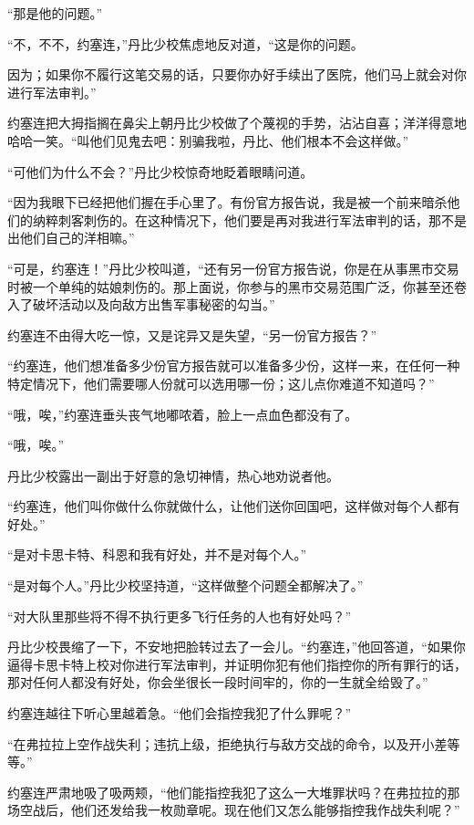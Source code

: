     “那是他的问题。”

    “不，不不，约塞连，”丹比少校焦虑地反对道，“这是你的问题。

    因为；如果你不履行这笔交易的话，只要你办好手续出了医院，他们马上就会对你进行军法审判。”

    约塞连把大拇指搁在鼻尖上朝丹比少校做了个蔑视的手势，沾沾自喜；洋洋得意地哈哈一笑。“叫他们见鬼去吧：别骗我啦，丹比、他们根本不会这样做。”

    “可他们为什么不会？”丹比少校惊奇地眨着眼睛问道。

    “因为我眼下已经把他们握在手心里了。有份官方报告说，我是被一个前来暗杀他们的纳粹刺客刺伤的。在这种情况下，他们要是再对我进行军法审判的话，那不是出他们自己的洋相嘛。”

    “可是，约塞连！”丹比少校叫道，“还有另一份官方报告说，你是在从事黑市交易时被一个单纯的姑娘刺伤的。那上面说，你参与的黑市交易范围广泛，你甚至还卷入了破坏活动以及向敌方出售军事秘密的勾当。”

    约塞连不由得大吃一惊，又是诧异又是失望，“另一份官方报告？”

    “约塞连，他们想准备多少份官方报告就可以准备多少份，这样一来，在任何一种特定情况下，他们需要哪人份就可以选用哪一份；这儿点你难道不知道吗？”

    “哦，唉，”约塞连垂头丧气地嘟哝着，脸上一点血色都没有了。

    “哦，唉。”

    丹比少校露出一副出于好意的急切神情，热心地劝说者他。

    “约塞连，他们叫你做什么你就做什么，让他们送你回国吧，这样做对每个人都有好处。”

    “是对卡思卡特、科恩和我有好处，并不是对每个人。”

    “是对每个人。”丹比少校坚持道，“这样做整个问题全都解决了。”

    “对大队里那些将不得不执行更多飞行任务的人也有好处吗？”

    丹比少校畏缩了一下，不安地把脸转过去了一会儿。“约塞连，”他回答道，“如果你逼得卡思卡特上校对你进行军法审判，并证明你犯有他们指控你的所有罪行的话，那对任何人都没有好处，你会坐很长一段时间牢的，你的一生就全给毁了。”

    约塞连越往下听心里越着急。“他们会指控我犯了什么罪呢？”

    “在弗拉拉上空作战失利；违抗上级，拒绝执行与敌方交战的命令，以及开小差等等。”

    约塞连严肃地吸了吸两颊，“他们能指控我犯了这么一大堆罪状吗？在弗拉拉的那场空战后，他们还发给我一枚勋章呢。现在他们又怎么能够指控我作战失利呢？”

